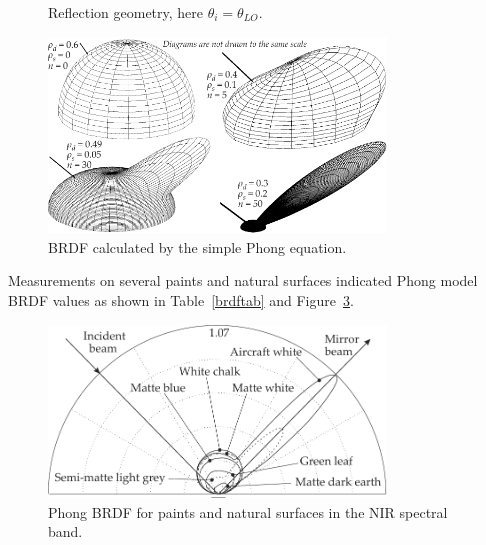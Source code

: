 \begin{figure}[bt]
\centerline{}
\caption{Reflection geometry, here $\theta_i=\theta_{LO}$.\label{fig:specref}}
\end{figure}

\begin{figure}[bt]
\centering
\includegraphics[width=0.8\textwidth]{pic/brdfPhongProfiles.pdf}
\caption{BRDF calculated by the simple Phong equation. \label{fig:brdfPhongProfiles}}
\end{figure}


Measurements on several paints and natural
surfaces\cite{Bergh2004} indicated Phong model BRDF values as shown in
Table~\ref{brdftab} and Figure~\ref{specref1}. 

\begin{figure}[tb]
\centering
\includegraphics[width=0.8\textwidth]{pic/specref1.pdf}
\caption{Phong BRDF for paints and natural surfaces in the NIR spectral band.
\label{specref1}}
\end{figure}


